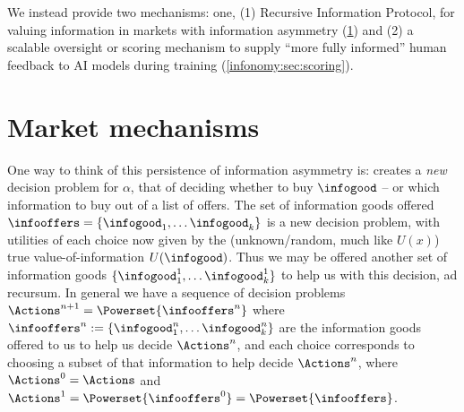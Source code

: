 


We instead provide two mechanisms: one, (1) Recursive Information Protocol, for valuing information in markets with information asymmetry (\cref{infonomy:sec:market}) and (2) a scalable oversight or scoring mechanism to supply ``more fully informed'' human feedback to AI models during training (\cref{infonomy:sec:scoring}).

\section{Market mechanisms}
\label{infonomy:sec:market}

One way to think of this persistence of information asymmetry is:  creates a \emph{new} decision problem for $\alpha$, that of deciding whether to buy $\infogood$ -- or which information to buy out of a list of offers. The set of information goods offered $\infooffers=\{\infogood_1,\dots\infogood_k\}$ is a new decision problem, with utilities of each choice now given by the (unknown/random, much like $U(x)$) true value-of-information $U(\infogood)$. Thus we may be offered another set of information goods $\{\infogood_1^1,\dots\infogood_k^1\}$ to help us with this decision, ad recursum. In general we have a sequence of decision problems $\Actions^{n+1}=\Powerset{\infooffers^n}$ where $\infooffers^n:=\{\infogood_1^n,\dots\infogood_k^n\}$ are the information goods offered to us to help us decide $\Actions^n$, and each choice corresponds to choosing a subset of that information to help decide $\Actions^n$, where $\Actions^0 =\Actions$ and $\Actions^1=\Powerset{\infooffers^0}=\Powerset{\infooffers}$.

